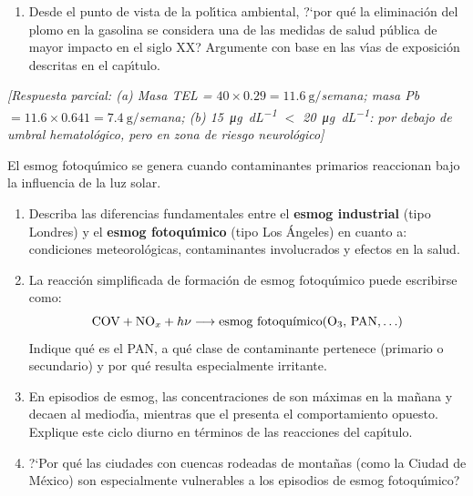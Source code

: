 \begin{bloque_ejercicios}
\begin{ejercicios}
\begin{enumerate}[label=\alph*)]
    \item Desde el punto de vista de la pol\'{\i}tica ambiental, ?`por
          qu\'e la eliminaci\'on del plomo en la gasolina se considera
          una de las medidas de salud p\'ublica de mayor impacto en
          el siglo XX? Argumente con base en las v\'{\i}as de exposici\'on
          descritas en el cap\'{\i}tulo.
\end{enumerate}

\textit{[Respuesta parcial:
(a) Masa TEL = $40 \times 0.29 = \SI{11.6}{\gram}/$semana;
masa Pb $= 11.6 \times 0.641 = \SI{7.4}{\gram}/$semana;
(b) \SI{15}{\micro\gram\per\deci\liter} $<$ \SI{20}{\micro\gram\per\deci\liter}: por debajo de umbral
hematol\'ogico, pero en zona de riesgo neurol\'ogico]}

\item El esmog fotoqu\'{\i}mico se genera cuando contaminantes primarios
reaccionan bajo la influencia de la luz solar.

\begin{enumerate}[label=\alph*)]
    \item Describa las diferencias fundamentales entre el
          \textbf{esmog industrial} (tipo Londres) y el
          \textbf{esmog fotoqu\'{\i}mico} (tipo Los \'Angeles) en cuanto a:
          condiciones meteorol\'ogicas, contaminantes involucrados
          y efectos en la salud.

    \item La reacci\'on simplificada de formaci\'on de esmog
          fotoqu\'{\i}mico puede escribirse como:
          \[
            \text{COV} + \text{NO}_x + h\nu \longrightarrow
            \text{esmog fotoqu\'{\i}mico} (\ce{O3},\,\text{PAN},\ldots)
          \]
          Indique qu\'e es el PAN, a qu\'e clase de contaminante
          pertenece (primario o secundario) y por qu\'e resulta
          especialmente irritante.

    \item En episodios de esmog, las concentraciones de 
          son m\'aximas en la ma\~nana y decaen al mediod\'{\i}a,
          mientras que el  presenta el comportamiento opuesto.
          Explique este ciclo diurno en t\'erminos de las reacciones
          del cap\'{\i}tulo.

    \item ?`Por qu\'e las ciudades con cuencas rodeadas de monta\~nas
          (como la Ciudad de M\'exico) son especialmente vulnerables
          a los episodios de esmog fotoqu\'{\i}mico?
\end{enumerate}


\end{ejercicios}
\end{bloque_ejercicios}
